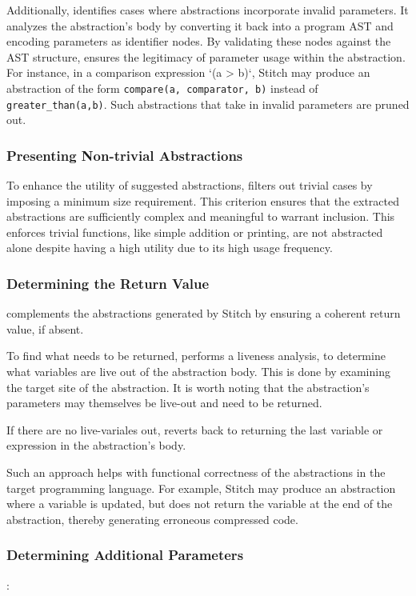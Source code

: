 Additionally, \toolname identifies cases where abstractions incorporate invalid parameters. It analyzes the abstraction’s body by converting it back into a program AST and encoding parameters as identifier nodes. By validating these nodes against the AST structure, \toolname ensures the legitimacy of parameter usage within the abstraction. For instance, in a comparison expression `(a > b)`, Stitch may produce an abstraction of the form \texttt{compare(a, comparator, b)} instead of \texttt{greater\_than(a,b)}. Such abstractions that take in invalid parameters are pruned out. 

\subsubsection{Presenting Non-trivial Abstractions}

To enhance the utility of suggested abstractions, \toolname filters out trivial cases by imposing a minimum size requirement. This criterion ensures that the extracted abstractions are sufficiently complex and meaningful to warrant inclusion. This enforces trivial functions, like simple addition or printing, are not abstracted alone despite having a high utility due to its high usage frequency. 

\subsubsection{Determining the Return Value}

\toolname complements the abstractions generated by Stitch by ensuring a coherent return value, if absent. 

To find what needs to be returned, \toolname performs a liveness analysis, to determine what variables are live out of the abstraction body. This is done by examining the target site of the abstraction. 
It is worth noting that the abstraction's parameters may themselves be live-out and need to be returned. 

If there are no live-variales out, \toolname reverts back to returning the last variable or expression in the abstraction’s body. 

Such an approach helps with functional correctness of the abstractions in the target programming language. For example, Stitch may produce an abstraction where a variable is updated, but does not return the variable at the end of the abstraction, thereby generating erroneous compressed code. 

\subsubsection{Determining Additional Parameters}:

